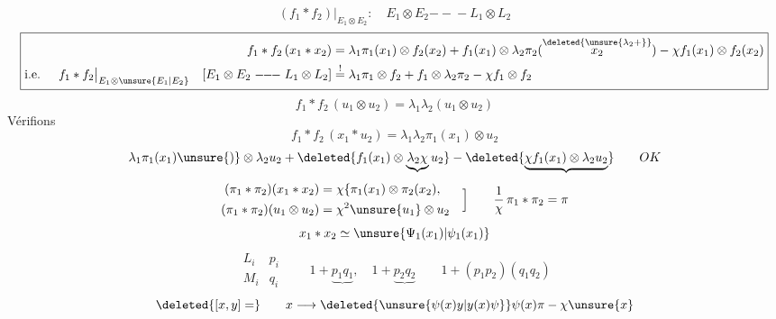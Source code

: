 \[
(f_1*f_2)\big|_{E_1\otimes E_2}:\quad E_1\otimes E_2\mathrel{-\!\!-\!\!-}L_1\otimes L_2
\]
\[
\boxed{\begin{aligned}
f_1*f_2\,(x_1*x_2)&=\lambda_1\pi_1(x_1)\otimes f_2(x_2)
+f_1(x_1)\otimes\lambda_2\pi_2(\overset{\deleted{\unsure{\lambda_2+}}}{x_2})
-\chi f_1(x_1)\otimes f_2(x_2)\\
\text{i.e. }\quad f_1*f_2\big|_{E_1\otimes\unsure{E_1|E_2}}
\quad[E_1\otimes E_2\mathrel{-\!\!-\!\!-}L_1\otimes L_2]
&\overset{!}{=}\lambda_1\pi_1\otimes f_2+f_1\otimes\lambda_2\pi_2-\chi f_1\otimes f_2
\end{aligned}}
\]
\[
f_1*f_2\,(u_1\otimes u_2)=\lambda_1\lambda_2(u_1\otimes u_2)
\]
Vérifions
\[
f_1*f_2\,(x_1*u_2)=\lambda_1\lambda_2\pi_1(x_1)\otimes u_2
\]
\[
\lambda_1\pi_1(x_1)\unsure{)}\otimes\lambda_2u_2+
\deleted{f_1(x_1)\otimes\underbrace{\lambda_2\chi}u_2}
-\deleted{\underbrace{\chi f_1(x_1)\otimes\lambda_2u_2}}
\qquad OK
\]
\[
\begin{aligned}
(\pi_1*\pi_2)(x_1*x_2)&=\chi\{\pi_1(x_1)\otimes\pi_2(x_2),\\
(\pi_1*\pi_2)(u_1\otimes u_2)&=\chi^2\unsure{u_1}\otimes u_2
\end{aligned}\quad\Big]
\qquad\frac1\chi\,\pi_1*\pi_2=\pi
\]
\[
x_1*x_2\simeq\unsure{\Psi_1(x_1)|\psi_1(x_1)}
\]
\[
\begin{array}{cc}
L_i&p_i\\[1em]M_i&q_i
\end{array}
\qquad1+\underbrace{p_1q_1},\quad1+\underbrace{p_2q_2}
\qquad1+(p_1p_2)(q_1q_2)
\]
\[
\deleted{[x,y]=}\qquad
x\longrightarrow\deleted{\unsure{\psi(x)y|y(x)\psi}}
\psi(x)\pi-\chi\unsure{x}
\]
